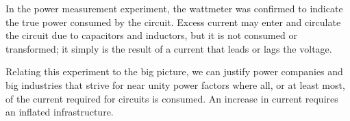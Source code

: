 \documentclass[12pt]{article}
\begin{document}
In the power measurement experiment, the wattmeter was confirmed to indicate the true power consumed by the circuit. Excess current may enter and circulate the circuit due to capacitors and inductors, but it is not consumed or transformed; it simply is the result of a current that leads or lags the voltage. 

Relating this experiment to the big picture, we can justify power companies and big industries that strive for near unity power factors where all, or at least most, of the current required for circuits is consumed. An increase in current requires an inflated infrastructure.
\newpage
\end{document}
